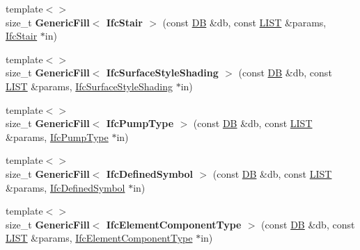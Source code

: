 \begin{DoxyCompactItemize}
\item 
\hypertarget{namespace_assimp_1_1_s_t_e_p_a67aaf8684888a490d06c3b0525ee182a}{{\footnotesize template$<$$>$ }\\size\+\_\+t {\bfseries Generic\+Fill$<$ Ifc\+Stair $>$} (const \hyperlink{class_assimp_1_1_s_t_e_p_1_1_d_b}{D\+B} \&db, const \hyperlink{class_assimp_1_1_s_t_e_p_1_1_e_x_p_r_e_s_s_1_1_l_i_s_t}{L\+I\+S\+T} \&params, \hyperlink{struct_assimp_1_1_i_f_c_1_1_ifc_stair}{Ifc\+Stair} $\ast$in)}\label{namespace_assimp_1_1_s_t_e_p_a67aaf8684888a490d06c3b0525ee182a}

\item 
\hypertarget{namespace_assimp_1_1_s_t_e_p_a6ded6a1e9709ee9aeb14be16d62905f3}{{\footnotesize template$<$$>$ }\\size\+\_\+t {\bfseries Generic\+Fill$<$ Ifc\+Surface\+Style\+Shading $>$} (const \hyperlink{class_assimp_1_1_s_t_e_p_1_1_d_b}{D\+B} \&db, const \hyperlink{class_assimp_1_1_s_t_e_p_1_1_e_x_p_r_e_s_s_1_1_l_i_s_t}{L\+I\+S\+T} \&params, \hyperlink{struct_assimp_1_1_i_f_c_1_1_ifc_surface_style_shading}{Ifc\+Surface\+Style\+Shading} $\ast$in)}\label{namespace_assimp_1_1_s_t_e_p_a6ded6a1e9709ee9aeb14be16d62905f3}

\item 
\hypertarget{namespace_assimp_1_1_s_t_e_p_a65cc33a48d44e28cefbce27dca74ce4a}{{\footnotesize template$<$$>$ }\\size\+\_\+t {\bfseries Generic\+Fill$<$ Ifc\+Pump\+Type $>$} (const \hyperlink{class_assimp_1_1_s_t_e_p_1_1_d_b}{D\+B} \&db, const \hyperlink{class_assimp_1_1_s_t_e_p_1_1_e_x_p_r_e_s_s_1_1_l_i_s_t}{L\+I\+S\+T} \&params, \hyperlink{struct_assimp_1_1_i_f_c_1_1_ifc_pump_type}{Ifc\+Pump\+Type} $\ast$in)}\label{namespace_assimp_1_1_s_t_e_p_a65cc33a48d44e28cefbce27dca74ce4a}

\item 
\hypertarget{namespace_assimp_1_1_s_t_e_p_a8386ab56c1a14f76b124192f095f9c14}{{\footnotesize template$<$$>$ }\\size\+\_\+t {\bfseries Generic\+Fill$<$ Ifc\+Defined\+Symbol $>$} (const \hyperlink{class_assimp_1_1_s_t_e_p_1_1_d_b}{D\+B} \&db, const \hyperlink{class_assimp_1_1_s_t_e_p_1_1_e_x_p_r_e_s_s_1_1_l_i_s_t}{L\+I\+S\+T} \&params, \hyperlink{struct_assimp_1_1_i_f_c_1_1_ifc_defined_symbol}{Ifc\+Defined\+Symbol} $\ast$in)}\label{namespace_assimp_1_1_s_t_e_p_a8386ab56c1a14f76b124192f095f9c14}

\item 
\hypertarget{namespace_assimp_1_1_s_t_e_p_a55c4da6c52ec06e77ee2df37ecf19477}{{\footnotesize template$<$$>$ }\\size\+\_\+t {\bfseries Generic\+Fill$<$ Ifc\+Element\+Component\+Type $>$} (const \hyperlink{class_assimp_1_1_s_t_e_p_1_1_d_b}{D\+B} \&db, const \hyperlink{class_assimp_1_1_s_t_e_p_1_1_e_x_p_r_e_s_s_1_1_l_i_s_t}{L\+I\+S\+T} \&params, \hyperlink{struct_assimp_1_1_i_f_c_1_1_ifc_element_component_type}{Ifc\+Element\+Component\+Type} $\ast$in)}\label{namespace_assimp_1_1_s_t_e_p_a55c4da6c52ec06e77ee2df37ecf19477}


\end{DoxyCompactItemize}
